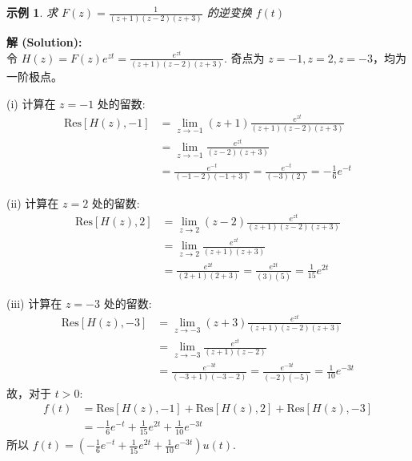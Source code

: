 \documentclass[linespread=1.5,openany]{book}%
\theoremstyle{plain}
\newtheorem{example}[theorem]{示例}
\begin{document}
{{{{{{{									\begin{example}求 $F(z) = \frac{1}{(z+1)(z-2)(z+3)}$ 的逆变换 $f(t)$ \label{ex:L16_inv_laplace_ex3}
									\end{example}
									\noindent\textbf{解 (Solution):} \\
									令 $H(z) = F(z)e^{zt} = \frac{e^{zt}}{(z+1)(z-2)(z+3)}$.
									奇点为 $z=-1, z=2, z=-3$，均为一阶极点。
									
									(i) 计算在 $z=-1$ 处的留数:
									\begin{align*}
										\text{Res}[H(z), -1] &= \lim_{z\to -1} (z+1) \frac{e^{zt}}{(z+1)(z-2)(z+3)} \\[6pt]
										&= \lim_{z\to -1} \frac{e^{zt}}{(z-2)(z+3)} \\[6pt]
										&= \frac{e^{-t}}{(-1-2)(-1+3)} = \frac{e^{-t}}{(-3)(2)} = -\frac{1}{6}e^{-t}
									\end{align*}
									
									(ii) 计算在 $z=2$ 处的留数:
									\begin{align*}
										\text{Res}[H(z), 2] &= \lim_{z\to 2} (z-2) \frac{e^{zt}}{(z+1)(z-2)(z+3)} \\[6pt]
										&= \lim_{z\to 2} \frac{e^{zt}}{(z+1)(z+3)} \\[6pt]
										&= \frac{e^{2t}}{(2+1)(2+3)} = \frac{e^{2t}}{(3)(5)} = \frac{1}{15}e^{2t}
									\end{align*}
									
									(iii) 计算在 $z=-3$ 处的留数:
									\begin{align*}
										\text{Res}[H(z), -3] &= \lim_{z\to -3} (z+3) \frac{e^{zt}}{(z+1)(z-2)(z+3)} \\[6pt]
										&= \lim_{z\to -3} \frac{e^{zt}}{(z+1)(z-2)} \\[6pt]
										&= \frac{e^{-3t}}{(-3+1)(-3-2)} = \frac{e^{-3t}}{(-2)(-5)} = \frac{1}{10}e^{-3t}
									\end{align*}
									故，对于 $t>0$:
									\begin{align*}
										f(t) &= \text{Res}[H(z), -1] + \text{Res}[H(z), 2] + \text{Res}[H(z), -3] \\[6pt]
										&= -\frac{1}{6}e^{-t} + \frac{1}{15}e^{2t} + \frac{1}{10}e^{-3t}
									\end{align*}
									所以 $f(t) = \left(-\frac{1}{6}e^{-t} + \frac{1}{15}e^{2t} + \frac{1}{10}e^{-3t}\right)u(t)$.
									
									\vspace{\baselineskip}
									
}}}}}}}
\end{document}
